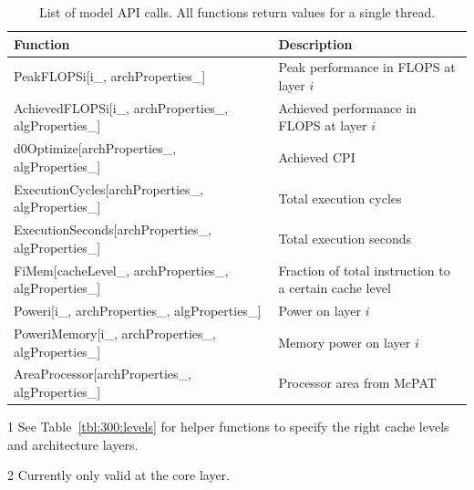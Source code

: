 \begin{table}
 \centering
 \small
 \caption{List of model API calls. All functions return values for a single thread.}
 \label{tbl:300:modelapi}
 \begin{threeparttable}
   \begin{tabular}{ll}
     \toprule
     \textbf{Function} & \textbf{Description} \\
     \midrule
     PeakFLOPSi[i\_, archProperties\_] & Peak performance in FLOPS at layer $i$\tnote{1} \\
     AchievedFLOPSi[i\_, archProperties\_, algProperties\_] & Achieved performance in FLOPS at layer $i$\tnote{2} \\
     d0Optimize[archProperties\_, algProperties\_] & Achieved CPI \\
     ExecutionCycles[archProperties\_, algProperties\_] & Total execution cycles \\
     ExecutionSeconds[archProperties\_, algProperties\_] & Total execution seconds \\
     FiMem[cacheLevel\_, archProperties\_, algProperties\_] & Fraction of total instruction to a certain cache level \\
     \midrule
     Poweri[i\_, archProperties\_, algProperties\_] & Power on layer $i$ \\
     PoweriMemory[i\_, archProperties\_, algProperties\_] & Memory power on layer $i$ \\
     AreaProcessor[archProperties\_, algProperties\_] & Processor area from McPAT \\
     \bottomrule
    \end{tabular}
    \begin{tablenotes}
      \item[1] See Table~\ref{tbl:300:levels} for helper functions to specify the right cache levels and architecture layers.
      \item[2] Currently only valid at the core layer.
    \end{tablenotes}
  \end{threeparttable}
\end{table}

